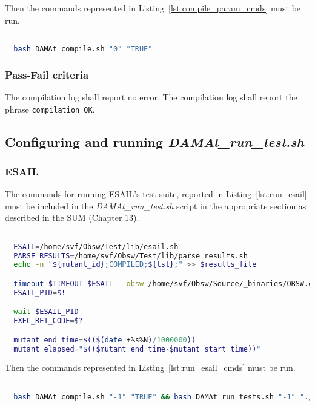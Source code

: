 Then the commands represented in Listing~\ref{lst:compile_param_cmds} must be run.

  \begin{lstlisting}[language=bash, label={lst:compile_param_cmds}]

  bash DAMAt_compile.sh "0" "TRUE"

  \end{lstlisting}

\subsubsection{Pass-Fail criteria}

The compilation log shall report no error.
The compilation log shall report the phrase \texttt{compilation OK}.

\subsection{Configuring and running \emph{DAMAt\_run\_test.sh}}

\subsubsection{ESAIL}

The commands for running ESAIL's test suite, reported in Listing~\ref{lst:run_esail} must be included in the \emph{DAMAt\_run\_test.sh} script in the appropriate section as described in the SUM (Chapter 13).


  \begin{lstlisting}[language=bash, label={lst:run_esail}]

  ESAIL=/home/svf/Obsw/Test/lib/esail.sh
  PARSE_RESULTS=/home/svf/Obsw/Test/lib/parse_results.sh
  echo -n "${mutant_id};COMPILED;${tst};" >> $results_file

  timeout $TIMEOUT $ESAIL --obsw /home/svf/Obsw/Source/_binaries/OBSW.exe --fast -n -c --source /home/svf/Obsw/Source --version 04010000 -t $tst &
  ESAIL_PID=$!

  wait $ESAIL_PID
  EXEC_RET_CODE=$?

  mutant_end_time=$(($(date +%s%N)/1000000))
  mutant_elapsed="$(($mutant_end_time-$mutant_start_time))"

  \end{lstlisting}

Then the commands represented in Listing~\ref{lst:run_esail_cmds} must be run.

  \begin{lstlisting}[language=bash, label={lst:run_esail_cmds}]

  bash DAMAt_compile.sh "-1" "TRUE" && bash DAMAt_run_tests.sh "-1" "./test_list.csv" "./"

  \end{lstlisting}

